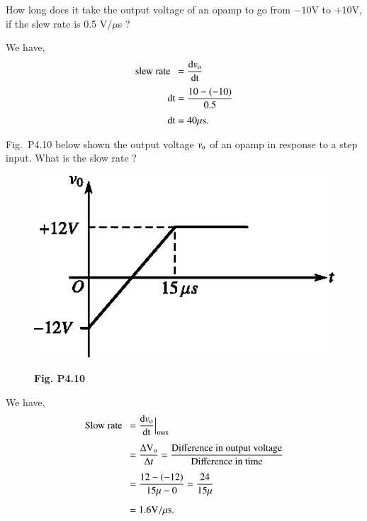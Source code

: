 \begin{problem}\label{prob4.9}
How long does it take the output voltage of an opamp to go from $-10$V to $+10$V, if the slew rate is 0.5 V/$\mu$s ?
\end{problem}

\begin{solution}
We have,
\begin{align*}
\text{slew rate~~} &= \frac{\text{d}v_{\textrm{o}}}{\operatorname{dt}}\\[3pt]
 \operatorname{dt} &= \frac{10-(-10)}{0.5}\\[3pt]
\operatorname{dt} &= 40 \mu \text{s}.
\end{align*}
\end{solution}

\begin{problem}\label{prob4.10}
Fig.~P4.10 below shown the output voltage $v_{\textrm{o}}$ of an opamp in response to a step input. What is the slow rate ?
\begin{figure}[H]
\centering
\includegraphics{chap4/fig4.11.eps}

\smallskip
{\bf Fig. P4.10}
\end{figure}
\end{problem}

\begin{solution}
We have,
\begin{align*}
\text{Slow rate~~} &= \dfrac{\text{d}v_{\textrm{o}}}{\operatorname{dt}}\Big|_{\max}\\[5pt]
&= \frac{\Delta \textrm{V}_{\textrm{o}}}{\Delta t}=\frac{\text{Difference in output voltage}}{\text{Difference in time}}\\[5pt]
&= \frac{12-(-12)}{15\mu -0}=\frac{24}{15\mu}\\[5pt]
&= 1.6 \textrm{V}/\mu \text{s}.
\end{align*}
\end{solution}

